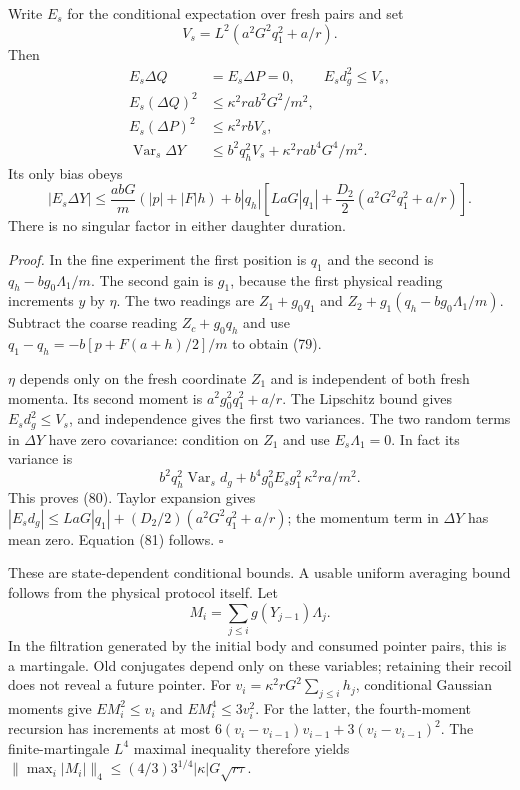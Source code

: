 \documentclass[11pt,a4paper]{article}
\begin{document}
Write \(E_s\) for the conditional expectation over fresh pairs and set
\[V_s=L^2(a^2G^2q_1^2+a/r).\] Then \[\begin{aligned}
E_s\Delta Q&=E_s\Delta P=0,\qquad E_s d_g^2\le V_s,\\
E_s(\Delta Q)^2&\le\kappa^2ra b^2G^2/m^2,\\
E_s(\Delta P)^2&\le\kappa^2rbV_s,\\
\operatorname{Var}_s\Delta Y
&\le b^2q_h^2V_s+\kappa^2ra b^4G^4/m^2.
\end{aligned}\tag{80}\] Its only bias obeys \[|E_s\Delta Y|\le
\frac{abG}{m}(|p|+|F|h)
+b|q_h|\left[LaG|q_1|
       +\frac{D_2}2(a^2G^2q_1^2+a/r)\right].\tag{81}\] There is no
singular factor in either daughter duration.

\emph{Proof.} In the fine experiment the first position is \(q_1\) and
the second is \(q_h-bg_0\Lambda_1/m\). The second gain is \(g_1\),
because the first physical reading increments \(y\) by \(\eta\). The two
readings are \(Z_1+g_0q_1\) and \(Z_2+g_1(q_h-bg_0\Lambda_1/m)\).
Subtract the coarse reading \(Z_c+g_0q_h\) and use
\(q_1-q_h=-b[p+F(a+h)/2]/m\) to obtain (79).

\(\eta\) depends only on the fresh coordinate \(Z_1\) and is independent
of both fresh momenta. Its second moment is \(a^2g_0^2q_1^2+a/r\). The
Lipschitz bound gives \(E_sd_g^2\le V_s\), and independence gives the
first two variances. The two random terms in \(\Delta Y\) have zero
covariance: condition on \(Z_1\) and use \(E_s\Lambda_1=0\). In fact its
variance is \[b^2q_h^2\operatorname{Var}_sd_g
 +b^4g_0^2E_sg_1^2\,\kappa^2ra/m^2.\] This proves (80). Taylor expansion
gives \(|E_sd_g|\le LaG|q_1|+(D_2/2)(a^2G^2q_1^2+a/r)\); the momentum
term in \(\Delta Y\) has mean zero. Equation (81) follows. \(\square\)

These are state-dependent conditional bounds. A usable uniform averaging
bound follows from the physical protocol itself. Let
\[M_i=\sum_{j\le i}g(Y_{j-1})\Lambda_j.\] In the filtration generated by
the initial body and consumed pointer pairs, this is a martingale. Old
conjugates depend only on these variables; retaining their recoil does
not reveal a future pointer. For \(v_i=\kappa^2rG^2\sum_{j\le i}h_j\),
conditional Gaussian moments give \(EM_i^2\le v_i\) and
\(EM_i^4\le3v_i^2\). For the latter, the fourth-moment recursion has
increments at most \(6(v_i-v_{i-1})v_{i-1}+3(v_i-v_{i-1})^2\). The
finite-martingale \(L^4\) maximal inequality therefore yields
\(\|\max_i|M_i|\|_4\le(4/3)3^{1/4}|\kappa|G\sqrt{r\tau}\).
\end{document}
